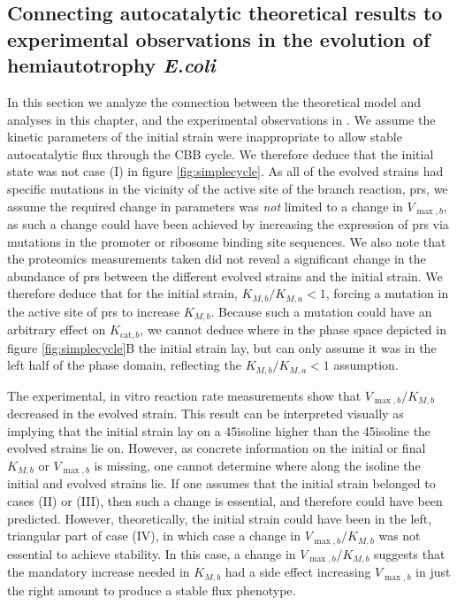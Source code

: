 \subsection{Connecting autocatalytic theoretical results to experimental observations in the evolution of hemiautotrophy \emph{E.coli}}
In this section we analyze the connection between the theoretical model and analyses in this chapter, and the experimental observations in \cite{Antonovsky2016-jy}.
We assume the kinetic parameters of the initial strain were inappropriate to allow stable autocatalytic flux through the CBB cycle.
We therefore deduce that the initial state was not case (I) in figure \ref{fig:simplecycle}.
As all of the evolved strains had specific mutations in the vicinity of the active site of the branch reaction, prs, we assume the required change in parameters was \emph{not} limited to a change in $V_{\max,b}$, as such a change could have been achieved by increasing the expression of prs via mutations in the promoter or ribosome binding site sequences.
We also note that the proteomics measurements taken did not reveal a significant change in the abundance of prs between the different evolved strains and the initial strain.
We therefore deduce that for the initial strain, $K_{M,b}/K_{M,a}<1$, forcing a mutation in the active site of prs to increase $K_{M,b}$.
Because such a mutation could have an arbitrary effect on $K_{\text{cat},b}$, we cannot deduce where in the phase space depicted in figure \ref{fig:simplecycle}B the initial strain lay, but can only assume it was in the left half of the phase domain, reflecting the $K_{M,b}/K_{M,a}<1$ assumption.

The experimental, in vitro reaction rate measurements show that $V_{\max,b}/K_{M,b}$ decreased in the evolved strain.
This result can be interpreted visually as implying that the initial strain lay on a 45\degree isoline higher than the 45\degree isoline the evolved strains lie on.
However, as concrete information on the initial or final $K_{M,b}$ or $V_{\max,b}$ is missing, one cannot determine where along the isoline the initial and evolved strains lie.
If one assumes that the initial strain belonged to cases (II) or (III), then such a change is essential, and therefore could have been predicted.
However, theoretically, the initial strain could have been in the left, triangular part of case (IV), in which case a change in $V_{\max,b}/K_{M,b}$ was not essential to achieve stability.
In this case, a change in $V_{\max,b}/K_{M,b}$ suggests that the mandatory increase needed in $K_{M,b}$ had a side effect increasing $V_{\max,b}$ in just the right amount to produce a stable flux phenotype.
